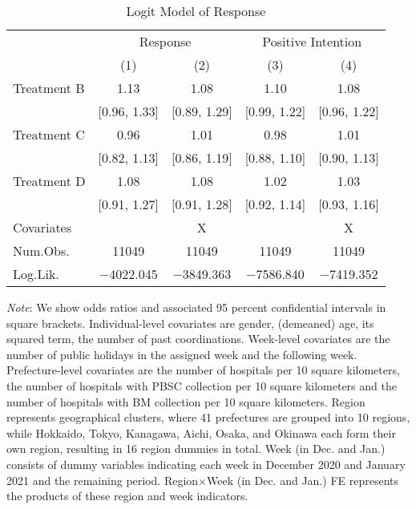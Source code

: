 \documentclass[12pt, a4paper]{article}
\begin{document}
\begin{landscape}\begin{table}[H]

\caption{\label{tab:reply-logit}Logit Model of Response}
\centering
\fontsize{8}{10}\selectfont
\begin{threeparttable}
\begin{tabular}[t]{lcccc}
\toprule
\multicolumn{1}{c}{ } & \multicolumn{2}{c}{Response} & \multicolumn{2}{c}{Positive Intention} \\
\cmidrule(l{3pt}r{3pt}){2-3} \cmidrule(l{3pt}r{3pt}){4-5}
  & (1) & (2) & (3) & (4)\\
\midrule
Treatment B & \num{1.13} & \num{1.08} & \num{1.10} & \num{1.08}\\
 & {}[\num{0.96}, \num{1.33}] & {}[\num{0.89}, \num{1.29}] & {}[\num{0.99}, \num{1.22}] & {}[\num{0.96}, \num{1.22}]\\
Treatment C & \num{0.96} & \num{1.01} & \num{0.98} & \num{1.01}\\
 & {}[\num{0.82}, \num{1.13}] & {}[\num{0.86}, \num{1.19}] & {}[\num{0.88}, \num{1.10}] & {}[\num{0.90}, \num{1.13}]\\
Treatment D & \num{1.08} & \num{1.08} & \num{1.02} & \num{1.03}\\
 & {}[\num{0.91}, \num{1.27}] & {}[\num{0.91}, \num{1.28}] & {}[\num{0.92}, \num{1.14}] & {}[\num{0.93}, \num{1.16}]\\
\midrule
Covariates &  & X &  & X\\
Num.Obs. & \num{11049} & \num{11049} & \num{11049} & \num{11049}\\
Log.Lik. & \num{-4022.045} & \num{-3849.363} & \num{-7586.840} & \num{-7419.352}\\
\bottomrule
\end{tabular}
\begin{tablenotes}
\item \emph{Note}: We show odds ratios and associated 95 percent confidential intervals in square brackets. Individual-level covariates are gender, (demeaned) age, its squared term, the number of past coordinations. Week-level covariates are the number of public holidays in the assigned week and the following week. Prefecture-level covariates are the number of hospitals per 10 square kilometers, the number of hospitals with PBSC collection per 10 square kilometers and the number of hospitals with BM collection per 10 square kilometers. Region represents geographical clusters, where 41 prefectures are grouped into 10 regions, while Hokkaido, Tokyo, Kanagawa, Aichi, Osaka, and Okinawa each form their own region, resulting in 16 region dummies in total. Week (in Dec. and Jan.) consists of dummy variables indicating each week in December 2020 and January 2021 and the remaining period. Region$\times$Week (in Dec. and Jan.) FE represents the products of these region and week indicators.
\end{tablenotes}
\end{threeparttable}
\end{table}
\end{landscape}
\end{document}
